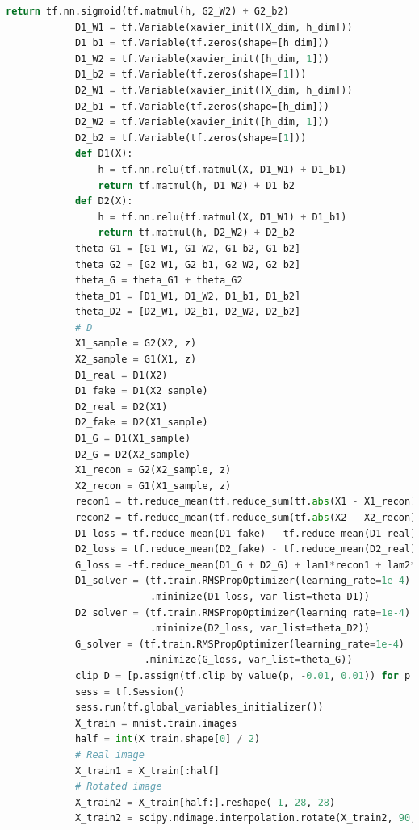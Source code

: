 \begin{lstlisting}[language = Python]
                return tf.nn.sigmoid(tf.matmul(h, G2_W2) + G2_b2)
            D1_W1 = tf.Variable(xavier_init([X_dim, h_dim]))
            D1_b1 = tf.Variable(tf.zeros(shape=[h_dim]))
            D1_W2 = tf.Variable(xavier_init([h_dim, 1]))
            D1_b2 = tf.Variable(tf.zeros(shape=[1]))
            D2_W1 = tf.Variable(xavier_init([X_dim, h_dim]))
            D2_b1 = tf.Variable(tf.zeros(shape=[h_dim]))
            D2_W2 = tf.Variable(xavier_init([h_dim, 1]))
            D2_b2 = tf.Variable(tf.zeros(shape=[1]))
            def D1(X):
                h = tf.nn.relu(tf.matmul(X, D1_W1) + D1_b1)
                return tf.matmul(h, D1_W2) + D1_b2
            def D2(X):
                h = tf.nn.relu(tf.matmul(X, D1_W1) + D1_b1)
                return tf.matmul(h, D2_W2) + D2_b2
            theta_G1 = [G1_W1, G1_W2, G1_b2, G1_b2]
            theta_G2 = [G2_W1, G2_b1, G2_W2, G2_b2]
            theta_G = theta_G1 + theta_G2
            theta_D1 = [D1_W1, D1_W2, D1_b1, D1_b2]
            theta_D2 = [D2_W1, D2_b1, D2_W2, D2_b2]
            # D
            X1_sample = G2(X2, z)
            X2_sample = G1(X1, z)
            D1_real = D1(X2)
            D1_fake = D1(X2_sample)
            D2_real = D2(X1)
            D2_fake = D2(X1_sample)
            D1_G = D1(X1_sample)
            D2_G = D2(X2_sample)
            X1_recon = G2(X2_sample, z)
            X2_recon = G1(X1_sample, z)
            recon1 = tf.reduce_mean(tf.reduce_sum(tf.abs(X1 - X1_recon), 1))
            recon2 = tf.reduce_mean(tf.reduce_sum(tf.abs(X2 - X2_recon), 1))
            D1_loss = tf.reduce_mean(D1_fake) - tf.reduce_mean(D1_real)
            D2_loss = tf.reduce_mean(D2_fake) - tf.reduce_mean(D2_real)
            G_loss = -tf.reduce_mean(D1_G + D2_G) + lam1*recon1 + lam2*recon2
            D1_solver = (tf.train.RMSPropOptimizer(learning_rate=1e-4)
                         .minimize(D1_loss, var_list=theta_D1))
            D2_solver = (tf.train.RMSPropOptimizer(learning_rate=1e-4)
                         .minimize(D2_loss, var_list=theta_D2))
            G_solver = (tf.train.RMSPropOptimizer(learning_rate=1e-4)
                        .minimize(G_loss, var_list=theta_G))
            clip_D = [p.assign(tf.clip_by_value(p, -0.01, 0.01)) for p in theta_D1 + theta_D2]
            sess = tf.Session()
            sess.run(tf.global_variables_initializer())
            X_train = mnist.train.images
            half = int(X_train.shape[0] / 2)
            # Real image
            X_train1 = X_train[:half]
            # Rotated image
            X_train2 = X_train[half:].reshape(-1, 28, 28)
            X_train2 = scipy.ndimage.interpolation.rotate(X_train2, 90, axes=(1, 2))

\end{lstlisting}
